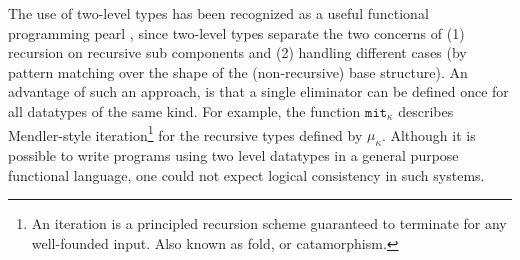 The use of two-level types has been recognized as
a useful functional programming pearl \cite{Sheard04}, since two-level types
separate the two concerns of (1) recursion on recursive sub components
and (2) handling different cases (by pattern matching over the shape of the (non-recursive) base structure).
An advantage of such an approach, is that a single eliminator can be defined once for
all datatypes of the same kind. For example, the function $\mathtt{mit}_\kappa$ describes
Mendler-style iteration\footnote{An iteration is a principled recursion
	scheme guaranteed to terminate for any well-founded input.
	Also known as fold, or catamorphism.} for the recursive types
defined by $\mu_\kappa$. Although it is possible to write programs using two level datatypes
in a general purpose functional language, one could
not expect logical consistency in such systems.

